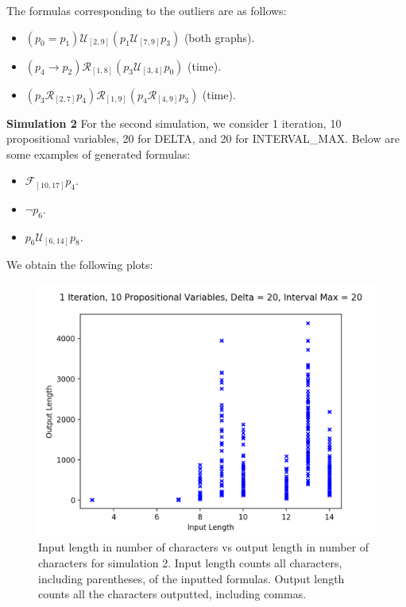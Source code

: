 \documentclass[runningheads]{llncs}
\begin{document}
\noindent The formulas corresponding to the outliers are as follows:
\vspace{-10mm}
\begin{itemize}
    \item $(p_0 = p_1) \mathcal{U}_{[2,9]} (p_1 \mathcal{U}_{[7,9]} p_3)$ (both graphs).
    \item $(p_4 \rightarrow p_2) \mathcal{R}_{[1,8]} (p_3 \mathcal{U}_{[3,4]} p_0)$ (time).
    \item $(p_3 \mathcal{R}_{[2,7]} p_4) \mathcal{R}_{[1,9]} (p_4 \mathcal{R}_{[4,9]} p_3)$ (time).
\end{itemize}
\noindent\textbf{Simulation 2}
For the second simulation, we consider 1 iteration, 10 propositional variables, 20 for DELTA, and 20 for INTERVAL\_MAX. Below are some examples of generated formulas:
\begin{itemize}
    \item $\mathcal{F}_{[10,17]} p_4$.
    \item $\neg p_6$.
    \item $p_6 \mathcal{U}_{[6,14]} p_8$.
\end{itemize}
We obtain the following plots:
\begin{figure}[H]
    \centering
    \includegraphics[scale=0.75]{images/Sim2Length.png}
    \caption{Input length in number of characters vs output length in number of characters for simulation 2. Input length counts all characters, including parentheses, of the inputted formulas. Output length counts all the characters outputted, including commas.}
\end{figure}
\end{document}
